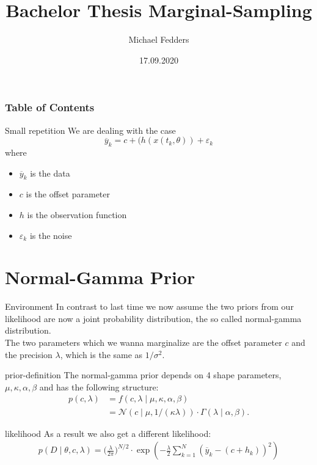 \documentclass{beamer}
\title{Bachelor Thesis Marginal-Sampling}
\date{17.09.2020}
\author{Michael Fedders}
\newcommand{\s}{\sigma^2}
\newcommand{\y}{\overline{y}}
\begin{document}
	\maketitle
  	\begin{frame}[plain]
		\frametitle{Table of Contents}
		\tableofcontents
	\end{frame}
	
	\begin{frame}{Small repetition}
		We are dealing with the case 
		\[
		\overline{y}_{k} = c + (h(x(t_k,\theta)) + \varepsilon_{k}
  		\]
  		where
  		\begin{itemize}
  		\item $\y_k$ is the data
  		\item $c$ is the offset parameter
  		\item $h$ is the observation function
  		\item $\varepsilon_k$ is the noise
  		\end{itemize}
	\end{frame}		
	
	
	
\section{Normal-Gamma Prior}

	\begin{frame}{Environment}
		In contrast to last time we now assume the two priors from our likelihood 			are now a joint probability distribution, the so called normal-gamma 				distribution. \\
		The two parameters which we wanna marginalize are the offset parameter $c$ 		and the precision $\lambda$, which is the same as $1/\s$.
	\end{frame}
  	
  	\begin{frame}{prior-definition}
  		The normal-gamma prior depends on 4 shape parameters, $\mu, \kappa, 				\alpha, \beta$ and has the following structure:
  		\begin{align}
  			p(c, \lambda) &= f(c, \lambda \mid \mu, \kappa, \alpha, \beta) \\
  			&= \mathcal{N}(c \mid \mu, 1/(\kappa \lambda)) \cdot \Gamma(\lambda 				\mid \alpha, \beta).
  		\end{align}
  	\end{frame}
  	
  	\begin{frame}{likelihood}
  		As a result we also get a different likelihood:
  		\begin{align}
  			 p(D \mid \theta, c, \lambda) = \biggl(\frac{\lambda}{2\pi}\biggr)					^{N/2} \cdot \exp\left( - \frac{\lambda}{2} \sum_{k = 1}^N (\y_k - (c 				+ h_k))^2 \right)
  		\end{align}
  	\end{frame}
  	
\end{document}
